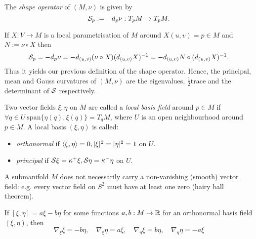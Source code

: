 \begin{definition}
	
	The \emph{shape operator} of $ (M,\nu) $ is given by	
		\[ \mathcal S_p := -d_p\nu:T_pM \rightarrow T_pM . \]
	
	
\end{definition}

\begin{remark}
	If $ X:V \rightarrow M $ is a local parametrisation of $ M $ around $ X(u,v)=p \in M $ and $ N:= \nu \circ X $ then 
		\[ \mathcal S_p = -d_p\nu = - d_{(u,v)}(\nu \circ X)(d_{(u,v)}X)^{-1} = -d_{(u,v)}N \circ (d_{(u,v)}X)^{-1}. \]
	Thus it yields our previous definition of the shape operator. Hence, the principal, mean and Gauss curvatures of $ (M,\nu) $ are the eigenvalues, $ \frac{1}{2} \mathrm{trace} $ and the determinant of $ \mathcal S $ respectively.
\end{remark}

\begin{definition}
	
	Two vector fields $ \xi,\eta $ on $ M $ are called a \emph{local basis field} around $ p \in M $ if $ \forall q \in U ~ \mathrm{span}\{ \eta(q), \xi(q) \} = T_qM$, where $ U $ is an open neighbourhood around $ p \in M $.
	A local basis $ (\xi,\eta) $ is called:
	\begin{itemize}
		\item \emph{orthonormal} if $ \left \langle \xi,\eta \right\rangle = 0, |\xi|^2 = |\eta|^2 = 1 $ on $ U $.
		\item \emph{principal} if $ \mathcal S\xi = \kappa^+\xi, \mathcal S\eta = \kappa^-\eta $ on $ U $.
	\end{itemize} 
	
\end{definition}

\begin{remark}
	
	A submanifold $ M $ does not necessarily carry a non-vanishing (smooth) vector field: e.g. every vector field on $ S^2 $ must have at least one zero (hairy ball theorem).
	
\end{remark}

\begin{lemma}
	If $ [\xi,\eta]=a\xi - b\eta $ for some functions $ a,b:M \rightarrow \mathbb R $ for an orthonormal basis field $ (\xi,\eta) $, then
		\[ \nabla_\xi \xi = - b \eta, \quad \nabla_\xi \eta = a\xi, \quad \nabla_\eta \xi =  b\eta, \quad \nabla_\eta \eta = - a\xi \]
\end{lemma}

